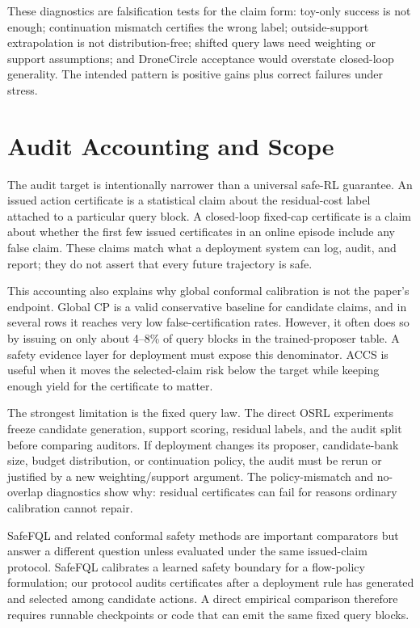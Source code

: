 \documentclass[letterpaper]{article}
\begin{document}
These diagnostics are falsification tests for the claim form: toy-only success
is not enough; continuation mismatch certifies the wrong label; outside-support
extrapolation is not distribution-free; shifted query laws need weighting or
support assumptions; and DroneCircle acceptance would overstate closed-loop
generality. The intended pattern is positive gains plus correct failures under
stress.

\section{Audit Accounting and Scope}

The audit target is intentionally narrower than a universal safe-RL guarantee.
An issued action certificate is a statistical claim about the residual-cost
label attached to a particular query block. A closed-loop fixed-cap certificate
is a claim about whether the first few issued certificates in an online episode
include any false claim. These claims match what a deployment system can log,
audit, and report; they do not assert that every future trajectory is safe.

This accounting also explains why global conformal calibration is not the
paper's endpoint. Global CP is a valid conservative baseline for candidate
claims, and in several rows it reaches very low false-certification rates.
However, it often does so by issuing on only about 4--8\% of query blocks in
the trained-proposer table. A safety evidence layer for deployment must expose
this denominator. ACCS is useful when it moves the selected-claim risk below
the target while keeping enough yield for the certificate to matter.

The strongest limitation is the fixed query law. The direct OSRL experiments
freeze candidate generation, support scoring, residual labels, and the audit
split before comparing auditors. If deployment changes its proposer,
candidate-bank size, budget distribution, or continuation policy, the audit
must be rerun or justified by a new weighting/support argument. The
policy-mismatch and no-overlap diagnostics show why: residual certificates can
fail for reasons ordinary calibration cannot repair.

SafeFQL and related conformal safety methods are important comparators but
answer a different question unless evaluated under the same issued-claim
protocol. SafeFQL calibrates a learned safety boundary for a flow-policy
formulation; our protocol audits certificates after a deployment rule has
generated and selected among candidate actions. A direct empirical comparison
therefore requires runnable checkpoints or code that can emit the same fixed
query blocks.
\end{document}
